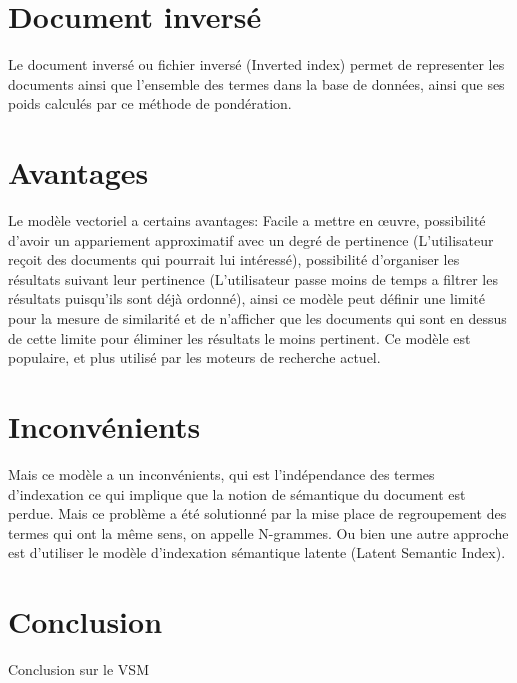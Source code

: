 \section{Document inversé}
Le document inversé ou fichier inversé (Inverted index) permet de representer les documents ainsi que l'ensemble des termes dans la base de données, ainsi que ses poids calculés par ce méthode de pondération.

\section{Avantages}
Le modèle vectoriel a certains avantages: Facile a mettre en œuvre, possibilité d'avoir un appariement approximatif avec un degré de pertinence (L'utilisateur reçoit des documents qui pourrait lui intéressé), possibilité d'organiser les résultats suivant leur pertinence (L'utilisateur passe moins de temps a filtrer les résultats puisqu'ils sont déjà ordonné), ainsi ce modèle peut définir une limité pour la mesure de similarité et de n'afficher que les documents qui sont en dessus de cette limite pour éliminer les résultats le moins pertinent. Ce modèle est populaire, et plus utilisé par les moteurs de recherche actuel. \citep*{approche-semantique, modern-ir, soulier2014:def-evaluation-modele}

\section{Inconvénients}
Mais ce modèle a un inconvénients, qui est l’indépendance des termes d'indexation ce qui implique que la notion de sémantique du document est perdue. Mais ce problème a été solutionné par la mise place de regroupement des termes qui ont la même sens, on appelle N-grammes. Ou bien une autre approche est d'utiliser le modèle d’indexation sémantique latente (Latent Semantic Index).

\section{Conclusion}
Conclusion sur le VSM
